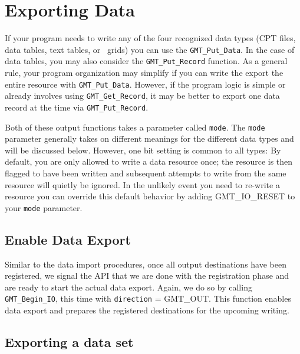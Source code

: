 \documentclass{report}
\begin{document}
\section{Exporting Data}

If your program needs to write any of the four recognized data types (CPT files, data tables, text tables, or \GMT\ grids)
you can use the \texttt{GMT\_Put\_Data}. In the case of data tables, you may also consider the
\texttt{GMT\_Put\_Record} function.
As a general rule, your program organization may simplify if you can write the export the entire resource with
\texttt{GMT\_Put\_Data}.  However, if the program logic is simple or already involves using \texttt{GMT\_Get\_Record},
it may be better to export one data record at the time via \texttt{GMT\_Put\_Record}.


Both of these output functions takes a parameter called \texttt{mode}.  The \texttt{mode} parameter generally
takes on different meanings for the different data types and will be discussed below.
However, one bit setting is common to all types: By default, you are only allowed to write a
data resource once; the resource is then flagged to have been written and subsequent attempts to write
from the same resource will quietly be ignored.  In the unlikely event you need to re-write a
resource you can override this default behavior by adding GMT\_IO\_RESET to your \texttt{mode} parameter.

\subsection{Enable Data Export}

Similar to the data import procedures, once all output destinations have been registered, we signal the API that we are done with the registration
phase and are ready to start the actual data export.  Again, we do so by calling \texttt{GMT\_Begin\_IO}, this time with \texttt{direction} = GMT\_OUT.
This function enables data export and prepares the registered destinations for the upcoming writing.  


\subsection{Exporting a data set}
\end{document}
